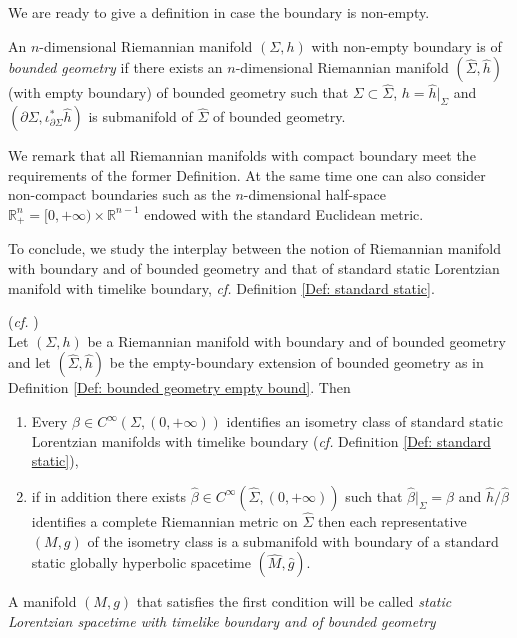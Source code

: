 We are ready to give a definition in case the boundary is non-empty.

\begin{Definition}\label{Def: bounded geometry boundary}
	An $n$-dimensional Riemannian manifold $(\Sigma,h)$ with non-empty boundary is of \emph{bounded geometry} if  there exists an $n$-dimensional Riemannian manifold $(\widehat{\Sigma},\widehat{h})$ (with empty boundary) of bounded geometry such that $\Sigma\subset\widehat{\Sigma}$, $h=\widehat{h}|_{\Sigma}$ and $(\partial\Sigma,\iota_{\partial\Sigma}^*\widehat{h})$ is submanifold of $\widehat{\Sigma}$ of bounded geometry.
\end{Definition}

We remark that all Riemannian manifolds with compact boundary meet the requirements
of the former Definition. At the same time one can also consider non-compact boundaries such as the $n$-dimensional half-space $\mathbb{R}_+^n=[0,+\infty)\times\mathbb{R}^{n-1}$ endowed with the standard Euclidean metric.

To conclude, we study the interplay between the notion of Riemannian manifold with boundary and of bounded geometry and that of standard static Lorentzian manifold with timelike boundary, \emph{cf.} Definition \ref{Def: standard static}.

\begin{proposition}(\emph{cf.} \cite[Prop. 9]{Dappiaggi-Drago-Ferreira-19})\\
	Let $(\Sigma, h)$ be a Riemannian manifold with boundary and of bounded geometry and let $(\widehat{\Sigma},\widehat{h})$ be the empty-boundary extension of bounded geometry as in Definition \ref{Def: bounded geometry empty bound}. Then
	\begin{enumerate}
		\item Every $\beta\in C^\infty (\Sigma, (0,+\infty))$ identifies an isometry class of standard static Lorentzian manifolds with timelike boundary (\emph{cf.} Definition \ref{Def: standard static}),
		\item if in addition there exists $\widehat{\beta}\in  C^\infty (\widehat{\Sigma}, (0,+\infty))$ such that $\widehat{\beta}|_\Sigma=\beta$ and $\widehat{h}/\widehat{\beta}$ identifies a complete Riemannian metric on $\widehat{\Sigma}$ then each representative $(M,g)$ of the isometry class is a submanifold with boundary of a standard static globally hyperbolic spacetime $(\widehat{M},\widehat{g})$.
	\end{enumerate}
A manifold $(M,g)$ that satisfies the first condition will be called \emph{static Lorentzian spacetime with timelike boundary and of bounded geometry}
\end{proposition}


